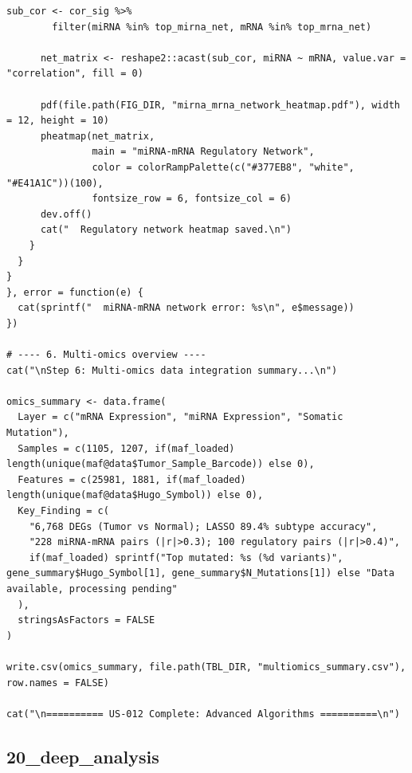 \documentclass[12pt,a4paper]{ctexart}
\begin{document}
\begin{lstlisting}[caption={12_advanced_algorithms}, basicstyle=\ttfamily\scriptsize]
      sub_cor <- cor_sig %>%
        filter(miRNA %in% top_mirna_net, mRNA %in% top_mrna_net)

      net_matrix <- reshape2::acast(sub_cor, miRNA ~ mRNA, value.var = "correlation", fill = 0)

      pdf(file.path(FIG_DIR, "mirna_mrna_network_heatmap.pdf"), width = 12, height = 10)
      pheatmap(net_matrix,
               main = "miRNA-mRNA Regulatory Network",
               color = colorRampPalette(c("#377EB8", "white", "#E41A1C"))(100),
               fontsize_row = 6, fontsize_col = 6)
      dev.off()
      cat("  Regulatory network heatmap saved.\n")
    }
  }
}
}, error = function(e) {
  cat(sprintf("  miRNA-mRNA network error: %s\n", e$message))
})

# ---- 6. Multi-omics overview ----
cat("\nStep 6: Multi-omics data integration summary...\n")

omics_summary <- data.frame(
  Layer = c("mRNA Expression", "miRNA Expression", "Somatic Mutation"),
  Samples = c(1105, 1207, if(maf_loaded) length(unique(maf@data$Tumor_Sample_Barcode)) else 0),
  Features = c(25981, 1881, if(maf_loaded) length(unique(maf@data$Hugo_Symbol)) else 0),
  Key_Finding = c(
    "6,768 DEGs (Tumor vs Normal); LASSO 89.4% subtype accuracy",
    "228 miRNA-mRNA pairs (|r|>0.3); 100 regulatory pairs (|r|>0.4)",
    if(maf_loaded) sprintf("Top mutated: %s (%d variants)", gene_summary$Hugo_Symbol[1], gene_summary$N_Mutations[1]) else "Data available, processing pending"
  ),
  stringsAsFactors = FALSE
)

write.csv(omics_summary, file.path(TBL_DIR, "multiomics_summary.csv"), row.names = FALSE)

cat("\n========== US-012 Complete: Advanced Algorithms ==========\n")
\end{lstlisting}

\subsection{20_deep_analysis}
\end{document}
